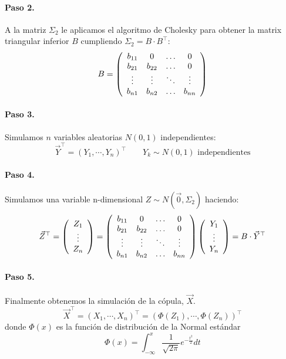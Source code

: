 \paragraph{Paso 2.} A la matriz $\Sigma_2$ le aplicamos el algoritmo de 
Cholesky para obtener la matrix triangular inferior $B$ cumpliendo 
$\Sigma_2 = B \cdot B^{\top}$:
\begin{displaymath}
B = 
\left(
\begin{array}{cccc}
b_{11}   & 0        & \ldots & 0       \cr
b_{21}   & b_{22}   & \ldots & 0       \cr
\vdots  & \vdots  & \ddots & \vdots \cr
b_{n1}   & b_{n2}   & \ldots & b_{nn}
\end{array}
\right)
\end{displaymath}

\paragraph{Paso 3.} Simulamos $n$ variables aleatorias $N(0,1)$ independientes:
\begin{displaymath}
\vec{Y}^{\top}=(Y_1, \cdots, Y_n)^{\top} \qquad Y_k \sim N(0,1) \textrm{ independientes}
\end{displaymath}

\paragraph{Paso 4.} Simulamos una variable n-dimensional $Z \sim N(\vec{0}, \Sigma_2)$
haciendo:
\begin{displaymath}
\vec{Z}^{\top} = 
\left(
\begin{array}{c}
Z_1 \cr
\vdots \cr
Z_n
\end{array}
\right) 
=
\left(
\begin{array}{cccc}
b_{11}   & 0        & \ldots & 0       \cr
b_{21}   & b_{22}   & \ldots & 0       \cr
\vdots  & \vdots  & \ddots & \vdots \cr
b_{n1}   & b_{n2}   & \ldots & b_{nn}
\end{array}
\right)
\left(
\begin{array}{c}
Y_1 \cr
\vdots \cr
Y_n
\end{array}
\right) 
 = B \cdot \vec{Y}^{\top}
\end{displaymath}

\paragraph{Paso 5.} Finalmente obtenemos la simulaci\'on de la c\'opula, $\vec{X}$.
\begin{displaymath}
\vec{X}^{\top} = (X_1, \cdots, X_n)^{\top} = (\Phi(Z_1), \cdots, \Phi(Z_n))^{\top}
\end{displaymath}
donde $\Phi(x)$ es la funci\'on de distribuci\'on de la Normal est\'andar
\begin{displaymath}
\Phi(x) = \int_{-\infty}^{x} \frac{1}{\sqrt{2 \pi}} e^{-\frac{t^2}{2}} dt
\end{displaymath}

